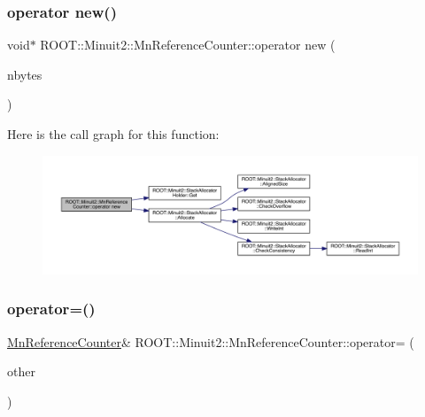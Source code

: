 \subsubsection{\texorpdfstring{operator new()}{operator new()}\hspace{0.1cm}{\footnotesize\ttfamily [3/3]}}
{\footnotesize\ttfamily void$\ast$ R\+O\+O\+T\+::\+Minuit2\+::\+Mn\+Reference\+Counter\+::operator new (\begin{DoxyParamCaption}\item[{size\+\_\+t}]{nbytes }\end{DoxyParamCaption})\hspace{0.3cm}{\ttfamily [inline]}}

Here is the call graph for this function\+:
\nopagebreak
\begin{figure}[H]
\begin{center}
\leavevmode
\includegraphics[width=350pt]{dc/da2/classROOT_1_1Minuit2_1_1MnReferenceCounter_af7e9fdee3f67cac68328bbd05f6f2958_cgraph}
\end{center}
\end{figure}
\mbox{\label{classROOT_1_1Minuit2_1_1MnReferenceCounter_a6a952f3f15d5dcfa10647c9df13a7caa}} 
\subsubsection{\texorpdfstring{operator=()}{operator=()}\hspace{0.1cm}{\footnotesize\ttfamily [1/3]}}
{\footnotesize\ttfamily \mbox{\hyperlink{classROOT_1_1Minuit2_1_1MnReferenceCounter}{Mn\+Reference\+Counter}}\& R\+O\+O\+T\+::\+Minuit2\+::\+Mn\+Reference\+Counter\+::operator= (\begin{DoxyParamCaption}\item[{const \mbox{\hyperlink{classROOT_1_1Minuit2_1_1MnReferenceCounter}{Mn\+Reference\+Counter}} \&}]{other }\end{DoxyParamCaption})\hspace{0.3cm}{\ttfamily [inline]}}


